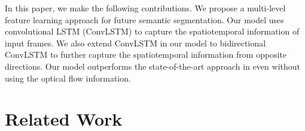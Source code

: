 \documentclass{bmvc2k}
\def\etal{\emph{et al}\bmvaOneDot}
\begin{document}

In this paper, we make the following contributions. We propose a multi-level feature learning approach for future semantic segmentation. Our model uses convolutional LSTM (ConvLSTM) to capture the spatiotemporal information of input frames. We also extend ConvLSTM in our model to bidirectional ConvLSTM to further capture the spatiotemporal information from opposite directions. Our model outperforms the state-of-the-art approach in \cite{jin2017predicting} even without using the optical flow information.

\section{Related Work}\label{sec:related}%
\end{document}
